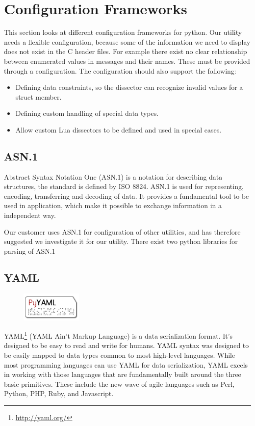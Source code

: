 \section{Configuration Frameworks}
\label{sec:pre:config}
This section looks at different configuration frameworks for python. Our
utility needs a flexible configuration, because some of the information we need
to display does not exist in the C header files. For example there exist no
clear relationship between enumerated values in messages and their names.
These must be provided through a configuration. The configuration should also
support the following:
\begin{itemize}
	\item Defining data constraints, so the dissector can recognize invalid
		values for a struct member.
	\item Defining custom handling of special data types.
	\item Allow custom Lua dissectors to be defined and used in special cases.
\end{itemize}

\subsection{ASN.1}
Abstract Syntax Notation One (ASN.1) is a notation for describing data
structures, the standard is defined by ISO 8824. ASN.1 is used for
representing, encoding, transferring and decoding of data. It provides a
fundamental tool to be used in application, which make it possible to exchange
information in a independent way.

Our customer uses ASN.1 for configuration of other utilities, and has therefore
suggested we investigate it for our utility. There exist two python libraries
for parsing of ASN.1

\subsection{YAML}
\begin{figure}
	\vspace{-30pt}
	\includegraphics[width=3cm]{./planning/img/pyyaml_logo}
	\vspace{-30pt}
\end{figure}
YAML\footnote{\url{http://yaml.org/}} (YAML Ain't Markup Language) is a data
serialization format. It's designed to be easy to read and write for humans.
YAML syntax was designed to be easily mapped to data types common to most
high-level languages. While most programming languages can use YAML for data
serialization, YAML excels in working with those languages that are
fundamentally built around the three basic primitives. These include the new
wave of agile languages such as Perl, Python, PHP, Ruby, and Javascript.

